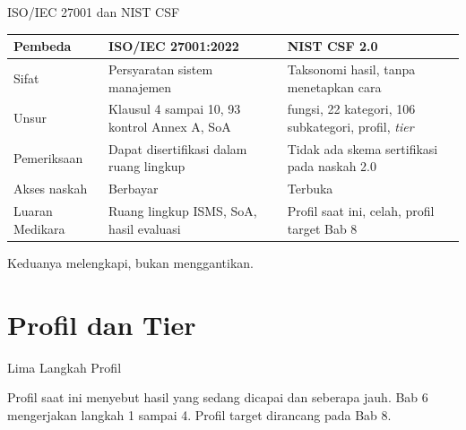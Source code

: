 \documentclass[aspectratio=169, table, 12pt]{beamer}
\begin{document}
\begin{frame}{{\Large ISO/IEC 27001 dan NIST CSF}}
  \vspace{2pt}
  \scriptsize
  \begin{tabularx}{\textwidth}{|>{\raggedright\arraybackslash}p{}|>{\raggedright\arraybackslash}X|>{\raggedright\arraybackslash}X|}
    \hline
    \textbf{Pembeda} & \textbf{ISO/IEC 27001:2022} & \textbf{NIST CSF 2.0} \\ \hline
    Sifat & Persyaratan sistem manajemen & Taksonomi hasil, tanpa menetapkan cara \\ \hline
    Unsur & Klausul 4 sampai 10, 93 kontrol Annex A, SoA & 6 fungsi, 22 kategori, 106 subkategori,
    profil, \textit{tier} \\ \hline
    Pemeriksaan & Dapat disertifikasi dalam ruang lingkup & Tidak ada skema sertifikasi pada naskah
    2.0 \\ \hline
    Akses naskah & Berbayar & Terbuka \\ \hline
    Luaran Medikara & Ruang lingkup ISMS, SoA, hasil evaluasi & Profil saat ini, celah, profil target
    Bab 8 \\ \hline
  \end{tabularx}

  \vspace{8pt}
  \small Keduanya melengkapi, bukan menggantikan.
\end{frame}

\section{Profil dan Tier}

\begin{frame}{{\Large Lima Langkah Profil}}
  \vspace{6pt}
  \begin{center}
    \resizebox{0.95\textwidth}{!}{}
  \end{center}
  \small Profil saat ini menyebut hasil yang sedang dicapai dan seberapa jauh. Bab 6 mengerjakan
  langkah 1 sampai 4. Profil target dirancang pada Bab 8.
\end{frame}
\end{document}
